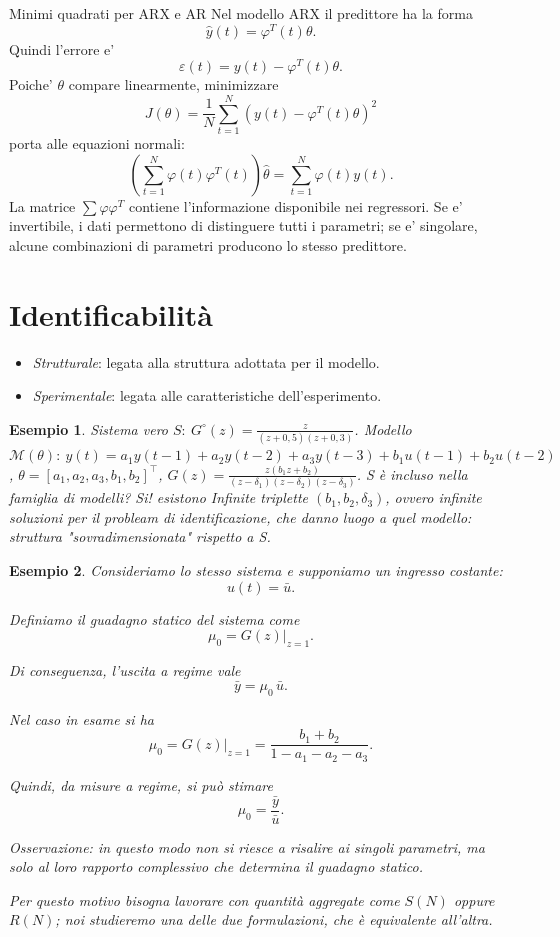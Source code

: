 \documentclass[11pt,a4paper]{article}
\newtheorem{example}{Esempio}
\begin{document}
\begin{spiegazione}{Minimi quadrati per ARX e AR}
Nel modello ARX il predittore ha la forma
\[
\hat y(t)=\varphi^T(t)\theta.
\]
Quindi l'errore e'
\[
\varepsilon(t)=y(t)-\varphi^T(t)\theta.
\]
Poiche' $\theta$ compare linearmente, minimizzare
\[
J(\theta)=\frac{1}{N}\sum_{t=1}^{N}(y(t)-\varphi^T(t)\theta)^2
\]
porta alle equazioni normali:
\[
\left(\sum_{t=1}^{N}\varphi(t)\varphi^T(t)\right)\hat\theta
=
\sum_{t=1}^{N}\varphi(t)y(t).
\]
La matrice $\sum\varphi\varphi^T$ contiene l'informazione disponibile nei regressori. Se e' invertibile, i dati permettono di distinguere tutti i parametri; se e' singolare, alcune combinazioni di parametri producono lo stesso predittore.
\end{spiegazione}

\section{Identificabilità}

\begin{itemize}
  \item \emph{Strutturale}: legata alla struttura adottata per il modello.
  \item \emph{Sperimentale}: legata alle caratteristiche dell'esperimento.
\end{itemize}

\begin{example}
Sistema vero $S:\ G^{\circ}(z)=\frac{z}{(z+0{,}5)(z+0{,}3)}$.
Modello $\mathcal{M}(\theta):\ y(t)=a_1 y(t-1)+a_2 y(t-2)+a_3 y(t-3)+b_1 u(t-1)+b_2 u(t-2)$, $\theta=[a_1,a_2,a_3,b_1,b_2]^{\top}$, $G(z)=\frac{z(b_1 z+b_2)}{(z-\delta_1)(z-\delta_2)(z-\delta_3)}$. 
S è incluso nella famiglia di modelli? Si! esistono Infinite triplette $(b_1,b_2,\delta_3)$, ovvero infinite soluzioni per il probleam di identificazione, che danno luogo a quel modello: struttura "sovradimensionata" rispetto a S.
\end{example}
\begin{example}
 
Consideriamo lo stesso sistema e supponiamo un ingresso costante:
\[
u(t)=\bar u.
\]

Definiamo il guadagno statico del sistema come
\[
\mu_0 = G(z)\big|_{z=1}.
\]

Di conseguenza, l'uscita a regime vale
\[
\bar y = \mu_0\,\bar u.
\]

Nel caso in esame si ha
\[
\mu_0 = G(z)\big|_{z=1}
      = \frac{b_1+b_2}{1-a_1-a_2-a_3}.
\]

Quindi, da misure a regime, si può stimare
\[
\mu_0=\frac{\bar y}{\bar u}.
\]

Osservazione: in questo modo non si riesce a risalire ai singoli parametri, ma solo al loro rapporto complessivo che determina il guadagno statico.

Per questo motivo bisogna lavorare con quantità aggregate come $S(N)$ oppure $R(N)$; noi studieremo una delle due formulazioni, che è equivalente all'altra.
    
\end{example}
\end{document}
